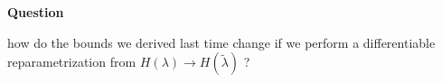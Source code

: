 
\begin{bluebox}
  \textbf{Question}

  how do the bounds we derived last time change if we perform a differentiable reparametrization from \(H(\lambda) \rightarrow H(\widetilde{\lambda} )\) ? 
\end{bluebox}
